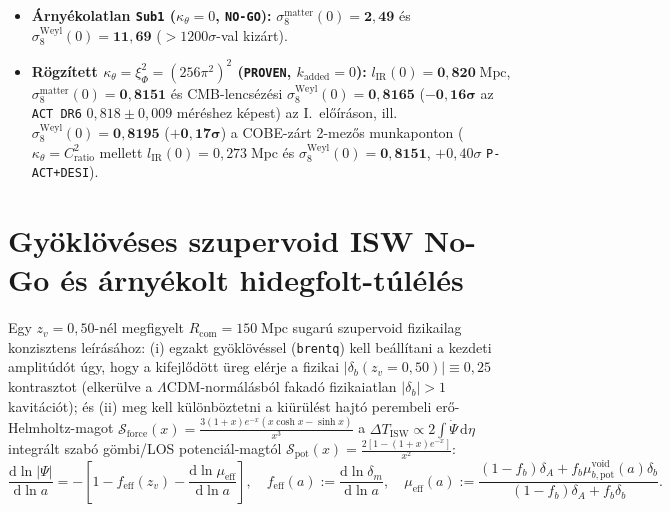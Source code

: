 \documentclass[11pt,a4paper]{article}
\begin{document}
\begin{itemize}
  \item \textbf{Árnyékolatlan {\upshape\texttt{Sub1}} ($\kappa_\theta = 0$, {\upshape\texttt{NO-GO}}):} $\sigma_8^{\mathrm{matter}}(0) = \mathbf{2{,}49}$ és $\sigma_8^{\mathrm{Weyl}}(0) = \mathbf{11{,}69}$ ($>1200\sigma$-val kizárt).
  \item \textbf{Rögzített $\kappa_\theta = \xi_\Phi^2 = (256\pi^2)^2$ ({\upshape\texttt{PROVEN}}, $k_{\mathrm{added}} = 0$):} $l_{\mathrm{IR}}(0) = \mathbf{0{,}820\;\mathrm{Mpc}}$, $\sigma_8^{\mathrm{matter}}(0) = \mathbf{0{,}8151}$ és CMB-lencsézési $\sigma_8^{\mathrm{Weyl}}(0) = \mathbf{0{,}8165}$ ($\mathbf{-0{,}16\sigma}$ az {\upshape\texttt{ACT DR6}} $0{,}818 \pm 0{,}009$ méréshez képest) az I.~előíráson, ill.\ $\sigma_8^{\mathrm{Weyl}}(0) = \mathbf{0{,}8195}$ ($\mathbf{+0{,}17\sigma}$) a COBE-zárt 2-mezős munkaponton ($\kappa_\theta = C_{\mathrm{ratio}}^2$ mellett $l_{\mathrm{IR}}(0) = 0{,}273\;\mathrm{Mpc}$ és $\sigma_8^{\mathrm{Weyl}}(0) = \mathbf{0{,}8151}$, $+0{,}40\sigma$ {\upshape\texttt{P-ACT+DESI}}).
\end{itemize}

\section{Gyöklövéses szupervoid ISW No-Go és árnyékolt hidegfolt-túlélés}
\label{sec:isw-supervoid}

Egy $z_v = 0{,}50$-nél megfigyelt $R_{\mathrm{com}} = 150\;\mathrm{Mpc}$ sugarú szupervoid fizikailag konzisztens leírásához: (i) egzakt gyöklövéssel (\texttt{brentq}) kell beállítani a kezdeti amplitúdót úgy, hogy a kifejlődött üreg elérje a fizikai $|\delta_b(z_v = 0{,}50)| \equiv 0{,}25$ kontrasztot (elkerülve a $\Lambda$CDM-normálásból fakadó fizikaiatlan $|\delta_b| > 1$ kavitációt); és (ii) meg kell különböztetni a kiürülést hajtó perembeli erő-Helmholtz-magot $\mathcal{S}_{\mathrm{force}}(x) = \frac{3(1+x)e^{-x}(x\cosh x - \sinh x)}{x^3}$ a $\Delta T_{\mathrm{ISW}} \propto 2\int\dot{\Psi}\,\mathrm{d}\eta$ integrált szabó gömbi/LOS potenciál-magtól $\mathcal{S}_{\mathrm{pot}}(x) = \frac{2[1 - (1+x)e^{-x}]}{x^2}$:
\begin{equation}
  \frac{\mathrm{d}\ln|\Psi|}{\mathrm{d}\ln a} = -\left[1 - f_{\mathrm{eff}}(z_v) - \frac{\mathrm{d}\ln\mu_{\mathrm{eff}}}{\mathrm{d}\ln a}\right], \quad f_{\mathrm{eff}}(a) := \frac{\mathrm{d}\ln\delta_m}{\mathrm{d}\ln a}, \quad \mu_{\mathrm{eff}}(a) := \frac{(1 - f_b)\delta_A + f_b\mu_{b,\mathrm{pot}}^{\mathrm{void}}(a)\delta_b}{(1 - f_b)\delta_A + f_b\delta_b}.
  \label{eq:isw-exact}
\end{equation}
\end{document}

